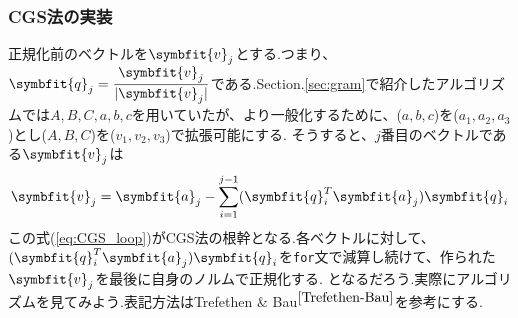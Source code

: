 \subsubsection{CGS法の実装}
正規化前のベクトルを$\symbfit{v}_j$とする.つまり、
$
    \symbfit{q}_j = \dfrac{\symbfit{v}_j}{|\symbfit{v}_j|}
$である.Section.\ref{sec:gram}で紹介したアルゴリズムでは$A,B,C,a,b,c$を用いていたが、より一般化するために、($a,b,c$)を($a_1,a_2,a_3$)とし($A,B,C$)を($v_1,v_2,v_3$)で拡張可能にする.
そうすると、$j$番目のベクトルである$\symbfit{v}_j$は
\begin{equation}
    \symbfit{v}_j = \symbfit{a}_j - \sum_{i=1}^{j-1}(\symbfit{q}_i^T\symbfit{a}_j)\symbfit{q}_i \label{eq:CGS_loop}
\end{equation}
この式(\ref{eq:CGS_loop})がCGS法の根幹となる.各ベクトルに対して、$(\symbfit{q}_i^T\symbfit{a}_j)\symbfit{q}_i$を\verb|for|文で減算し続けて、作られた$\symbfit{v}_j$を最後に自身のノルムで正規化する.
となるだろう.実際にアルゴリズムを見てみよう.表記方法はTrefethen \& Bau$^{\cite{Trefethen-Bau}}$を参考にする.
